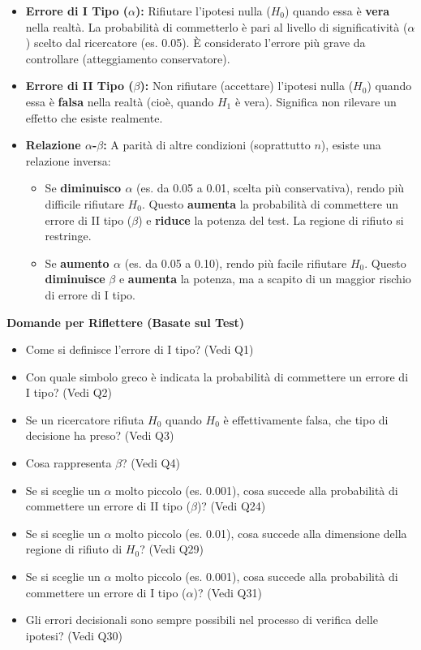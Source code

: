 \documentclass[12pt, a4paper]{article}
\newenvironment{reflectionbox}{%
    \medskip
    \begin{framed}\par\noindent
    \textbf{\color{boxtitlecolor}Domande per Riflettere (Basate sul Test)} \par
    \begin{itemize}[leftmargin=*, label=$\blacktriangleright$]
}{%
    \end{itemize}\par
    \end{framed}
    \medskip
}
\newcommand{\alphaerr}{\alpha} %
\newcommand{\betaerr}{\beta}  %
\newcommand{\Hnull}{H_0} %
\newcommand{\Halt}{H_1} %
\begin{document}
\begin{itemize}
    \item \textbf{Errore di I Tipo ($\alphaerr$):} Rifiutare l'ipotesi nulla ($\Hnull$) quando essa è \textbf{vera} nella realtà. La probabilità di commetterlo è pari al livello di significatività ($\alphaerr$) scelto dal ricercatore (es. 0.05). È considerato l'errore più grave da controllare (atteggiamento conservatore).
    \item \textbf{Errore di II Tipo ($\betaerr$):} Non rifiutare (accettare) l'ipotesi nulla ($\Hnull$) quando essa è \textbf{falsa} nella realtà (cioè, quando $\Halt$ è vera). Significa non rilevare un effetto che esiste realmente.
    \item \textbf{Relazione $\alphaerr$-$\betaerr$:} A parità di altre condizioni (soprattutto $n$), esiste una relazione inversa:
        \begin{itemize}
            \item Se \textbf{diminuisco $\alphaerr$} (es. da 0.05 a 0.01, scelta più conservativa), rendo più difficile rifiutare $\Hnull$. Questo \textbf{aumenta} la probabilità di commettere un errore di II tipo ($\betaerr$) e \textbf{riduce} la potenza del test. La regione di rifiuto si restringe.
            \item Se \textbf{aumento $\alphaerr$} (es. da 0.05 a 0.10), rendo più facile rifiutare $\Hnull$. Questo \textbf{diminuisce} $\betaerr$ e \textbf{aumenta} la potenza, ma a scapito di un maggior rischio di errore di I tipo.
        \end{itemize}
\end{itemize}

\begin{reflectionbox}
    \item Come si definisce l'errore di I tipo? (Vedi Q1)
    \item Con quale simbolo greco è indicata la probabilità di commettere un errore di I tipo? (Vedi Q2)
    \item Se un ricercatore rifiuta $\Hnull$ quando $\Hnull$ è effettivamente falsa, che tipo di decisione ha preso? (Vedi Q3)
    \item Cosa rappresenta $\betaerr$? (Vedi Q4)
    \item Se si sceglie un $\alphaerr$ molto piccolo (es. 0.001), cosa succede alla probabilità di commettere un errore di II tipo ($\betaerr$)? (Vedi Q24)
    \item Se si sceglie un $\alphaerr$ molto piccolo (es. 0.01), cosa succede alla dimensione della regione di rifiuto di $\Hnull$? (Vedi Q29)
     \item Se si sceglie un $\alphaerr$ molto piccolo (es. 0.001), cosa succede alla probabilità di commettere un errore di I tipo ($\alphaerr$)? (Vedi Q31)
    \item Gli errori decisionali sono sempre possibili nel processo di verifica delle ipotesi? (Vedi Q30)
\end{reflectionbox}
\end{document}
